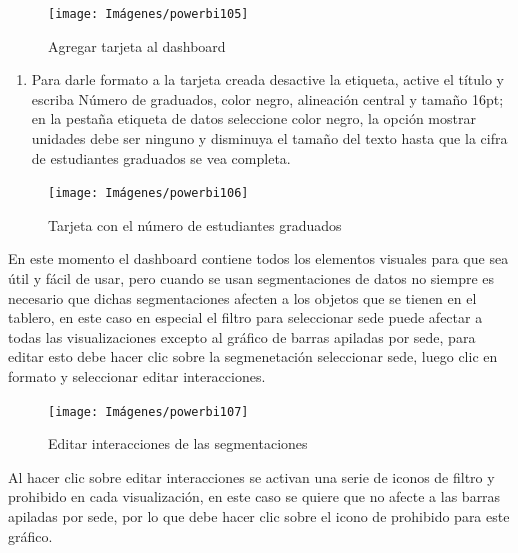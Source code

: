 \documentclass[
]{book}
\providecommand{\tightlist}{%
  \setlength{\itemsep}{0pt}\setlength{\parskip}{0pt}}
\begin{document}
\begin{figure}

{\centering \texttt{[image: Imágenes/powerbi105]} 

}

\caption{Agregar tarjeta al dashboard}\label{fig:paso1tarjeta-fig}
\end{figure}

\begin{enumerate}
\def\labelenumi{\arabic{enumi}.}
\setcounter{enumi}{1}
\tightlist
\item
  Para darle formato a la tarjeta creada desactive la etiqueta, active el título y escriba Número de graduados, color negro, alineación central y tamaño 16pt; en la pestaña etiqueta de datos seleccione color negro, la opción mostrar unidades debe ser ninguno y disminuya el tamaño del texto hasta que la cifra de estudiantes graduados se vea completa.
\end{enumerate}

\begin{figure}

{\centering \texttt{[image: Imágenes/powerbi106]} 

}

\caption{Tarjeta con el número de estudiantes graduados}\label{fig:paso2tarjeta-fig}
\end{figure}

En este momento el dashboard contiene todos los elementos visuales para que sea útil y fácil de usar, pero cuando se usan segmentaciones de datos no siempre es necesario que dichas segmentaciones afecten a los objetos que se tienen en el tablero, en este caso en especial el filtro para seleccionar sede puede afectar a todas las visualizaciones excepto al gráfico de barras apiladas por sede, para editar esto debe hacer clic sobre la segmenetación seleccionar sede, luego clic en formato y seleccionar editar interacciones.

\begin{figure}

{\centering \texttt{[image: Imágenes/powerbi107]} 

}

\caption{Editar interacciones de las segmentaciones}\label{fig:editarinteracciones-fig}
\end{figure}

Al hacer clic sobre editar interacciones se activan una serie de iconos de filtro y prohibido en cada visualización, en este caso se quiere que no afecte a las barras apiladas por sede, por lo que debe hacer clic sobre el icono de prohibido para este gráfico.
\end{document}
